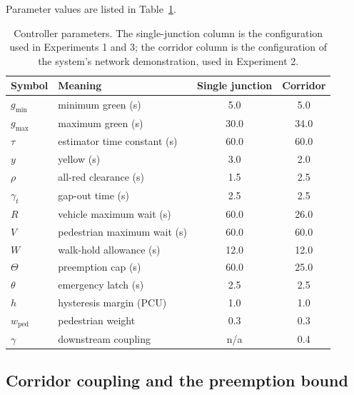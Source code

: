 \documentclass[journal]{IEEEtran}
\newcommand{\pcu}{PCU}
\begin{document}
Parameter values are listed in Table~\ref{tab:params}.

\begin{table}[t]
\centering
\caption{Controller parameters. The single-junction column is the configuration used in Experiments
1 and 3; the corridor column is the configuration of the system's network demonstration, used in
Experiment 2.}
\label{tab:params}
\small
\begin{tabular}{llcc}
\toprule
Symbol & Meaning & Single junction & Corridor \\
\midrule
$g_{\min}$ & minimum green (s) & 5.0 & 5.0 \\
$g_{\max}$ & maximum green (s) & 30.0 & 34.0 \\
$\tau$ & estimator time constant (s) & 60.0 & 60.0 \\
$y$ & yellow (s) & 3.0 & 2.0 \\
$\rho$ & all-red clearance (s) & 1.5 & 2.5 \\
$\gamma_t$ & gap-out time (s) & 2.5 & 2.5 \\
$R$ & vehicle maximum wait (s) & 60.0 & 26.0 \\
$V$ & pedestrian maximum wait (s) & 60.0 & 60.0 \\
$W$ & walk-hold allowance (s) & 12.0 & 12.0 \\
$\Theta$ & preemption cap (s) & 60.0 & 25.0 \\
$\theta$ & emergency latch (s) & 2.5 & 2.5 \\
$h$ & hysteresis margin (\pcu) & 1.0 & 1.0 \\
$w_{\mathrm{ped}}$ & pedestrian weight & 0.3 & 0.3 \\
$\gamma$ & downstream coupling & n/a & 0.4 \\
\bottomrule
\end{tabular}
\end{table}

\subsection{Corridor coupling and the preemption bound}
\end{document}
